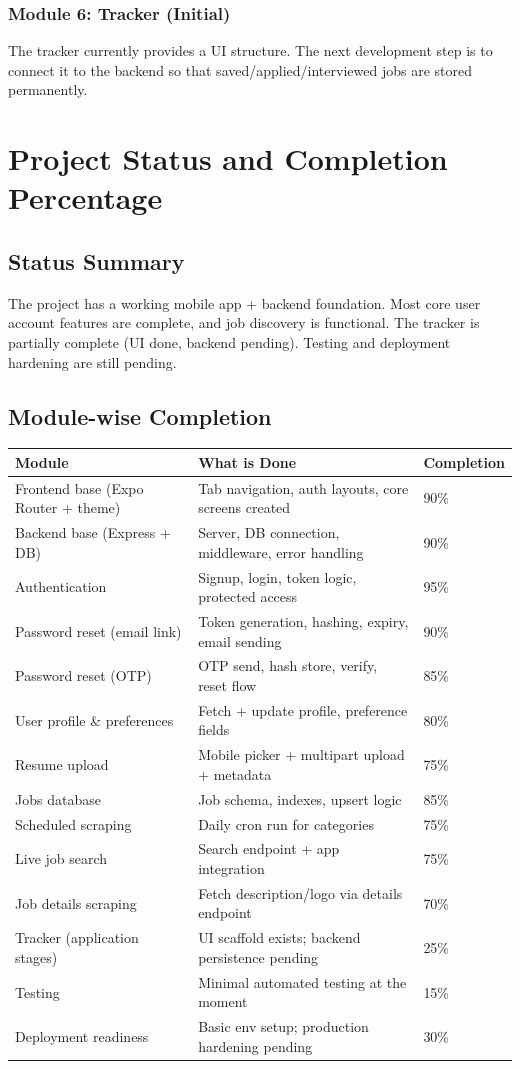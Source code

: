 \documentclass[12pt,a4paper]{report}
\begin{document}
\subsection*{Module 6: Tracker (Initial)}
\noindent
The tracker currently provides a UI structure. The next development step is to connect it to the backend so that saved/applied/interviewed jobs are stored permanently.

\chapter{Project Status and Completion Percentage}
\section*{Status Summary}
\noindent
The project has a working mobile app + backend foundation. Most core user account features are complete, and job discovery is functional. The tracker is partially complete (UI done, backend pending). Testing and deployment hardening are still pending.

\section*{Module-wise Completion}

\begin{longtable}{p{} p{} p{}}
\toprule
\textbf{Module} & \textbf{What is Done} & \textbf{Completion} \\
\midrule
\endhead
Frontend base (Expo Router + theme) & Tab navigation, auth layouts, core screens created & 90\% \\
Backend base (Express + DB) & Server, DB connection, middleware, error handling & 90\% \\
Authentication & Signup, login, token logic, protected access & 95\% \\
Password reset (email link) & Token generation, hashing, expiry, email sending & 90\% \\
Password reset (OTP) & OTP send, hash store, verify, reset flow & 85\% \\
User profile \& preferences & Fetch + update profile, preference fields & 80\% \\
Resume upload & Mobile picker + multipart upload + metadata & 75\% \\
Jobs database & Job schema, indexes, upsert logic & 85\% \\
Scheduled scraping & Daily cron run for categories & 75\% \\
Live job search & Search endpoint + app integration & 75\% \\
Job details scraping & Fetch description/logo via details endpoint & 70\% \\
Tracker (application stages) & UI scaffold exists; backend persistence pending & 25\% \\
Testing & Minimal automated testing at the moment & 15\% \\
Deployment readiness & Basic env setup; production hardening pending & 30\% \\
\bottomrule
\end{longtable}
\end{document}
